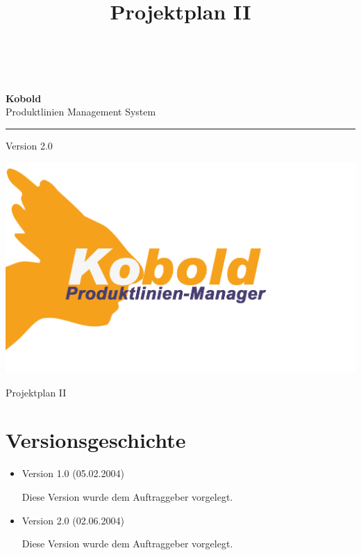 \documentclass[a4paper,titlepage,12pt,ngerman]{scrbook}
\title {\huge \product\\[0.5cm]\large Projektplan II\\[0.5cm] \version
  \\[1cm] \Large \company}
\newcommand\version{Version 2.0\xspace}
\begin{document}

\begin{titlepage}
\renewcommand{\thefootnote}{\fnsymbol{footnote}}
{\Huge
\raggedright
\textbf{\bf Kobold} \\
\huge Produktlinien Management System
\rule{\textwidth}{0.75pt}
\par
}
\begin{flushleft}
\normalsize
\version
\end{flushleft}

\vspace*{3cm}
\begin{center}
\includegraphics[width=15cm]{../common/logo-color.png}
\end{center}
\vfill

{\parindent=0cm
\Huge Projektplan II
}


\setcounter{footnote}{0}
\end{titlepage}


\section*{Versionsgeschichte}

\begin{itemize}

\item Version 1.0 (05.02.2004)

  Diese Version wurde dem Auftraggeber vorgelegt.

\item Version 2.0 (02.06.2004)

  Diese Version wurde dem Auftraggeber vorgelegt.

\end{itemize}
\end{document}

